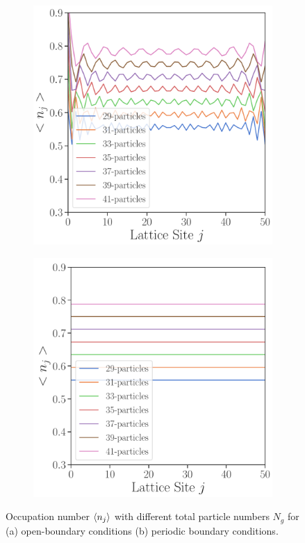 \documentclass[11pt, a4paper, oneside]{book}
\theoremstyle{definition} %
\begin{document}
\begin{figure}[h]
\centering
\begin{subfigure}[t]{0.49\textwidth}
	\centering
	\includegraphics[width =\textwidth]{Occupation_number_H0_OBC}
	\caption{}
	\label{fig:occupation_number1_OBC}
\end{subfigure}
\begin{subfigure}[t]{0.49\textwidth}
	\centering
	\includegraphics[width =\textwidth]{Occupation_number_H0_PBC}
	\caption{}
	\label{occupation_numer1_PBC}
\end{subfigure}
\caption{Occupation number $\expval{n_j}$ with different total particle numbers $N_g$ for (a) open-boundary conditions (b) periodic boundary conditions.}
\label{fig:occupation_number1d}
\end{figure}
\end{document}

